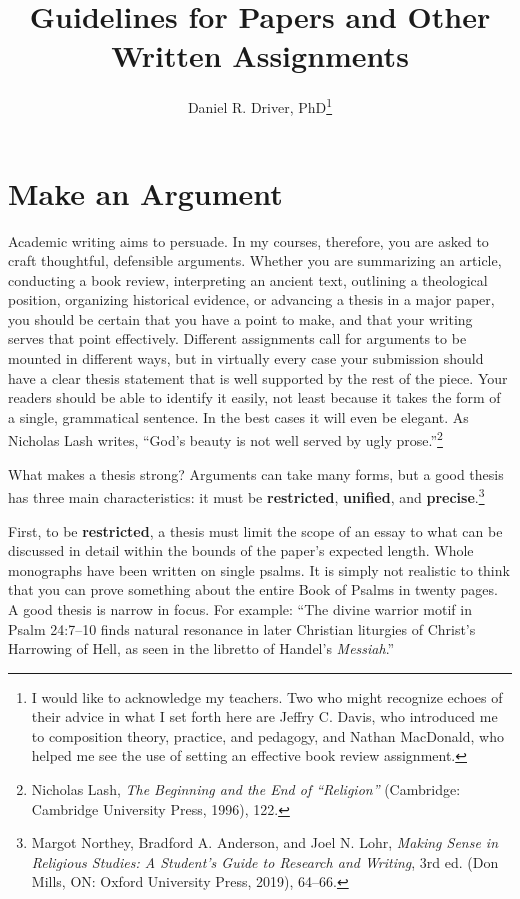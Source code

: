 \documentclass[11pt,twocolumn]{article}
\title{Guidelines for Papers and Other Written Assignments}
\author{Daniel R. Driver, PhD\thanks{I would like to acknowledge my
teachers. Two who might recognize echoes of their advice in what I set
forth here are Jeffry C. Davis, who introduced me to composition theory,
practice, and pedagogy, and Nathan MacDonald, who helped me see the use
of setting an effective book review assignment.}}
\date{}
\begin{document}
\maketitle

\section{Make an Argument}

Academic writing aims to persuade. In my courses, therefore, you are
asked to craft thoughtful, defensible arguments. Whether you are
summarizing an article, conducting a book review, interpreting an
ancient text, outlining a theological position, organizing historical
evidence, or advancing a thesis in a major paper, you should be certain
that you have a point to make, and that your writing serves that point
effectively. Different assignments call for arguments to be mounted in
different ways, but in virtually every case your submission should have
a clear thesis statement that is well supported by the rest of the
piece. Your readers should be able to identify it easily, not least
because it takes the form of a single, grammatical sentence. In the best
cases it will even be elegant. As Nicholas Lash writes, “God’s beauty is
not well served by ugly prose.”\footnote{Nicholas Lash, \emph{The
Beginning and the End of “Religion”} (Cambridge: Cambridge University
Press, 1996), 122.}

What makes a thesis strong? Arguments can take many forms, but a good
thesis has three main characteristics: it must be \textbf{restricted},
\textbf{unified}, and \textbf{precise}.\footnote{Margot Northey,
Bradford A. Anderson, and Joel N. Lohr, \emph{Making Sense in Religious
Studies: A Student's Guide to Research and Writing}, 3rd ed. (Don Mills,
ON: Oxford University Press, 2019), 64–66.}

First, to be \textbf{restricted}, a thesis must limit the scope of an
essay to what can be discussed in detail within the bounds of the
paper's expected length. Whole monographs have been written on single
psalms. It is simply not realistic to think that you can prove something
about the entire Book of Psalms in twenty pages. A good thesis is narrow
in focus. For example: “The divine warrior motif in Psalm 24:7–10 finds
natural resonance in later Christian liturgies of Christ's Harrowing of
Hell, as seen in the libretto of Handel's \emph{Messiah}.”
\end{document}
